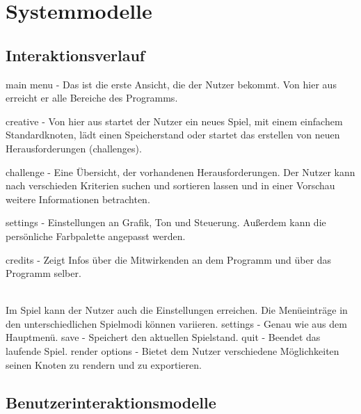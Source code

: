 \chapter{Systemmodelle}


\section{Interaktionsverlauf}

    main menu - Das ist die erste Ansicht, die der Nutzer bekommt. Von hier aus erreicht er alle Bereiche des Programms.
    
    creative - Von hier aus startet der Nutzer ein neues Spiel, mit einem einfachem Standardknoten, lädt einen Speicherstand oder startet das erstellen von neuen Herausforderungen (challenges).
    
    challenge - Eine Übersicht, der vorhandenen Herausforderungen. Der Nutzer kann nach verschieden Kriterien suchen und sortieren lassen und in einer Vorschau weitere Informationen betrachten.
    
    settings - Einstellungen an Grafik, Ton und Steuerung. Außerdem kann die persönliche Farbpalette angepasst werden.
    
    credits - Zeigt Infos über die Mitwirkenden an dem Programm und über das Programm selber.
    
	\begin{figure}[h]
	  \centering
	  
	\end{figure}
	~\\
	Im Spiel kann der Nutzer auch die Einstellungen erreichen. Die Menüeinträge in den unterschiedlichen Spielmodi können variieren.
	settings - Genau wie aus dem Hauptmenü.
	save - Speichert den aktuellen Spielstand.
	quit - Beendet das laufende Spiel.
	render options - Bietet dem Nutzer verschiedene Möglichkeiten seinen Knoten zu rendern und zu exportieren.
    \begin{figure}[htbp]
	  \centering
	  
	\end{figure}


\section{Benutzerinteraktionsmodelle}

	\begin{figure}[htbp]
	  \centering
	  
	\end{figure}


